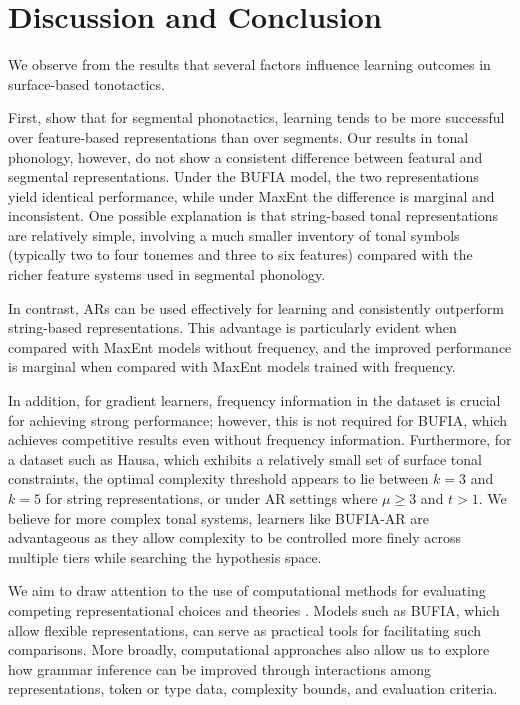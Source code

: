 \section{Discussion and Conclusion}
We observe from the results that several factors influence learning
outcomes in surface-based tonotactics.

First, \citet{wilson2018accidental} show that for segmental
phonotactics, learning tends to be more successful over
feature-based representations than over segments. Our results
in tonal phonology, however, do not show a consistent difference
between featural and segmental representations. Under the BUFIA
model, the two representations yield identical performance,
while under MaxEnt the difference is marginal and inconsistent.
One possible explanation is that string-based tonal representations
are relatively simple, involving a much smaller inventory of tonal
symbols (typically two to four tonemes and three to six
features) compared with the richer feature systems used in
segmental phonology.

In contrast, ARs can be used effectively for learning and
consistently outperform string-based representations.
This advantage is particularly evident when compared with
MaxEnt models without frequency, and the improved performance is
marginal when compared with MaxEnt models trained with frequency.

In addition, for gradient learners, frequency information in the
dataset is crucial for achieving strong performance; however,
this is not required for BUFIA, which achieves competitive
results even without frequency information. Furthermore, for
a dataset such as Hausa, which exhibits a relatively small
set of surface tonal constraints, the optimal complexity
threshold appears to lie between $k=3$ and $k=5$ for string
representations, or under AR settings where $\mu \geq 3$
and $t > 1$. We believe for more complex tonal systems, learners
like BUFIA-AR are advantageous as they allow complexity to be
controlled more finely across multiple tiers while searching the
hypothesis space.

We aim to draw attention to the use of computational methods
for evaluating competing representational choices and theories
\citep{oakdenNotationalEquivalenceTonal2020,danis2025logical}.
Models such as BUFIA, which allow flexible representations,
can serve as practical tools for facilitating such comparisons.
More broadly, computational approaches also allow us to explore
how grammar inference can be improved through interactions
among representations, token or type data, complexity bounds,
and evaluation criteria.


